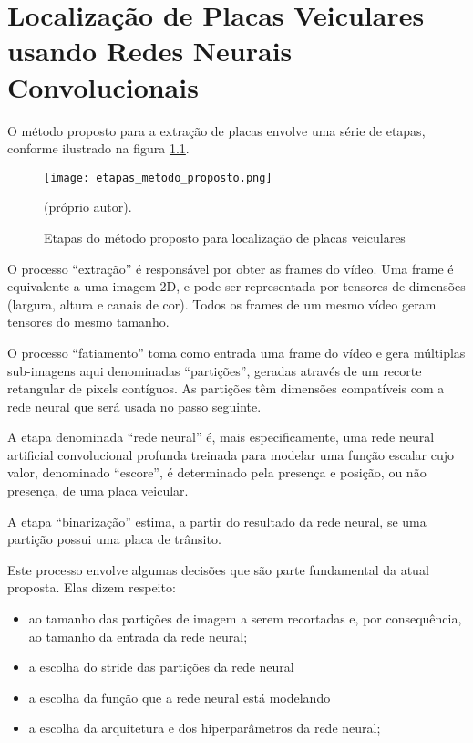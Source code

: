 
\chapter{Localização de Placas Veiculares usando Redes Neurais Convolucionais}

O método proposto para a extração de placas envolve uma série de etapas,
conforme ilustrado na figura \ref{fig:etapas_metodo_proposto}.

\begin{figure}[!htb]
	\centering
	\texttt{[image: etapas\_metodo\_proposto.png]}
	\caption{Etapas do método proposto para localização de placas veiculares}
	\label{fig:etapas_metodo_proposto}
	(próprio autor).
\end{figure}

O processo “extração” é responsável por obter as frames do vídeo. Uma frame é
equivalente a uma imagem 2D, e pode ser representada por tensores de dimensões
 (largura, altura e canais de cor). Todos os frames de um mesmo vídeo geram
tensores do mesmo tamanho.

O processo “fatiamento” toma como entrada uma frame do vídeo e gera múltiplas
sub-imagens aqui denominadas “partições”, geradas através de um recorte
retangular de pixels contíguos. As partições têm dimensões compatíveis com a
rede neural que será usada no passo seguinte.

A etapa denominada “rede neural” é, mais especificamente, uma rede neural
artificial convolucional profunda treinada para modelar uma função escalar cujo
valor, denominado “escore”, é determinado pela presença e posição, ou não
presença, de uma placa veicular.

A etapa “binarização” estima, a partir do resultado da rede neural, se uma
partição possui uma placa de trânsito.

Este processo envolve algumas decisões que são parte fundamental da atual
proposta. Elas dizem respeito:

\begin{itemize}
\item ao tamanho das partições de imagem a serem recortadas e, por
	consequência, ao tamanho da entrada da rede neural;
\item a escolha do stride das partições da rede neural
\item a escolha da função que a rede neural está modelando
\item a escolha da arquitetura e dos hiperparâmetros da rede neural;
\end{itemize}


